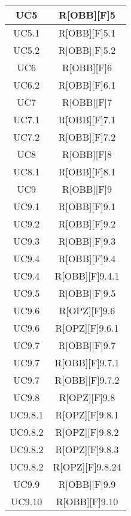 	\begin{table}[h]
		\centering
		\begin{tabular}{|c|c|}
			\midrule

			UC5 & R[OBB][F]5 \\ \midrule
			UC5.1 & R[OBB][F]5.1 \\ \midrule
			UC5.2 & R[OBB][F]5.2 \\ \midrule
			UC6 & R[OBB][F]6 \\ \midrule
			UC6.2 & R[OBB][F]6.1 \\ \midrule
			UC7 & R[OBB][F]7 \\ \midrule
			UC7.1 & R[OBB][F]7.1 \\ \midrule
			UC7.2 & R[OBB][F]7.2 \\ \midrule
			UC8 & R[OBB][F]8 \\ \midrule
			UC8.1 & R[OBB][F]8.1 \\ \midrule
			UC9 & R[OBB][F]9 \\ \midrule
			UC9.1 & R[OBB][F]9.1 \\ \midrule
			UC9.2 & R[OBB][F]9.2 \\ \midrule
			UC9.3 & R[OBB][F]9.3 \\ \midrule
			UC9.4 & R[OBB][F]9.4 \\ \midrule
			UC9.4 & R[OBB][F]9.4.1 \\ \midrule
			UC9.5 & R[OBB][F]9.5 \\ \midrule
			UC9.6 & R[OPZ][F]9.6 \\ \midrule
			UC9.6 & R[OPZ][F]9.6.1 \\ \midrule
			UC9.7 & R[OBB][F]9.7 \\ \midrule
			UC9.7 & R[OBB][F]9.7.1 \\ \midrule
			UC9.7 & R[OBB][F]9.7.2 \\ \midrule
			UC9.8 & R[OPZ][F]9.8 \\ \midrule
			UC9.8.1 & R[OPZ][F]9.8.1 \\ \midrule
			UC9.8.2 & R[OPZ][F]9.8.2 \\ \midrule
			UC9.8.2 & R[OPZ][F]9.8.3 \\ \midrule
			UC9.8.2 & R[OPZ][F]9.8.24 \\ \midrule
			UC9.9 & R[OBB][F]9.9 \\ \midrule
			UC9.10 & R[OBB][F]9.10 \\ \midrule

		\end{tabular}
	\end{table}
	\newpage
	

